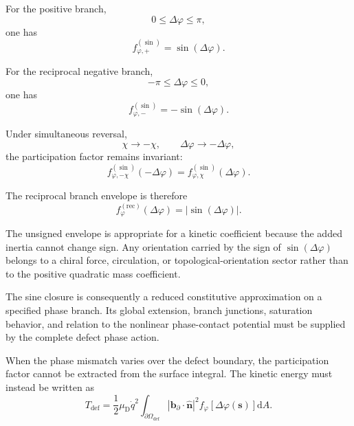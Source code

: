 For the positive branch,
\begin{equation}
    0 \leq \Delta\varphi \leq \pi,
\end{equation}
one has
\begin{equation}
    f_{\varphi,+}^{(\sin)} = \sin(\Delta\varphi).
\end{equation}

For the reciprocal negative branch,
\begin{equation}
    -\pi \leq \Delta\varphi \leq 0,
\end{equation}
one has
\begin{equation}
    f_{\varphi,-}^{(\sin)} = -\sin(\Delta\varphi).
\end{equation}

Under simultaneous reversal,
\begin{equation}
    \chi \rightarrow -\chi, \qquad \Delta\varphi \rightarrow -\Delta\varphi,
\end{equation}
the participation factor remains invariant:
\begin{equation}
    f_{\varphi,-\chi}^{(\sin)}(-\Delta\varphi) = f_{\varphi,\chi}^{(\sin)}(\Delta\varphi).
\end{equation}

The reciprocal branch envelope is therefore
\begin{equation}
    f_{\varphi}^{(\mathrm{rec})}(\Delta\varphi) = |\sin(\Delta\varphi)|.
\end{equation}

The unsigned envelope is appropriate for a kinetic coefficient because the added inertia cannot change sign. Any orientation carried by the sign of $\sin(\Delta\varphi)$ belongs to a chiral force, circulation, or topological-orientation sector rather than to the positive quadratic mass coefficient.

The sine closure is consequently a reduced constitutive approximation on a specified phase branch. Its global extension, branch junctions, saturation behavior, and relation to the nonlinear phase-contact potential must be supplied by the complete defect phase action.

When the phase mismatch varies over the defect boundary, the participation factor cannot be extracted from the surface integral. The kinetic energy must instead be written as
\begin{equation}
    T_{\mathrm{def}} = \frac{1}{2} \mu_{\mathrm{D}} \dot{q}^2 \int_{\partial\Omega_{\mathrm{def}}} \left| \mathbf{b}_{\partial}\cdot\hat{\mathbf{n}} \right|^2 f_{\varphi} \!\left[ \Delta\varphi(\boldsymbol{s}) \right] \mathrm{d}A.
\end{equation}

